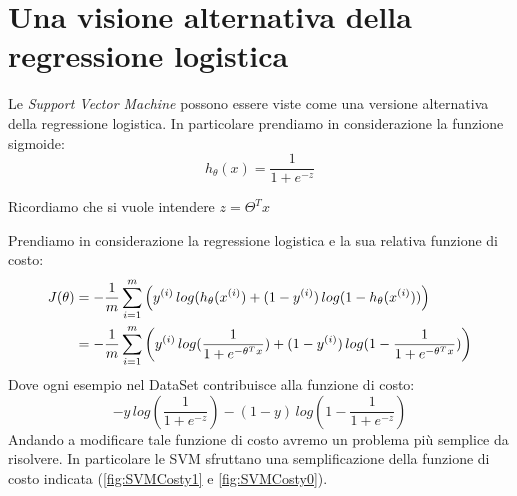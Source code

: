\section{Una visione alternativa della regressione logistica}
Le \textit{Support Vector Machine} possono essere viste come una versione alternativa della regressione logistica. In particolare prendiamo in considerazione la funzione sigmoide:
\[h_\theta(x) = \frac {1} {1 + e^{-z}}\]
\begin{nota}
Ricordiamo che si vuole intendere $z = \Theta^T x$
\end{nota}
Prendiamo in considerazione la regressione logistica e la sua relativa funzione di costo:
\begin{align*}
J(\theta) &= -{1 \over m} \sum_{i=1}^m \left( y^{(i)}\,log(h_\theta(x^{(i)}) + (1-y^{(i)})\,log(1 - h_\theta(x^{(i)})) \right) \\
    &= -{1 \over m} \sum_{i=1}^m \left( y^{(i)}\,log(\frac {1} {1 + e^{-\theta^T x}}) + (1-y^{(i)})\,log(1 - \frac {1} {1 + e^{-\theta^T x}}) \right)
\end{align*} %
Dove ogni esempio nel DataSet contribuisce alla funzione di costo:
\[-y\,log(\frac {1} {1 + e^{-z}}) - (1-y)\,log(1 - \frac {1} {1 + e^{-z}})\]
Andando a modificare tale funzione di costo avremo un problema più semplice da risolvere. In particolare le SVM sfruttano una semplificazione della funzione di costo indicata (\ref{fig:SVMCosty1} e \ref{fig:SVMCosty0}).
